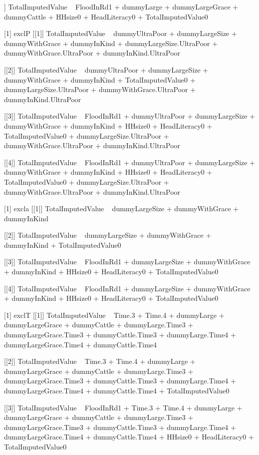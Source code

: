 \begin{Schunk}
\begin{Soutput}
[[4]]
TotalImputedValue ~ FloodInRd1 + dummyLarge + dummyLargeGrace + 
    dummyCattle + HHsize0 + HeadLiteracy0 + TotalImputedValue0

[1] exclP
[[1]]
TotalImputedValue ~ dummyUltraPoor + dummyLargeSize + dummyWithGrace + 
    dummyInKind + dummyLargeSize.UltraPoor + dummyWithGrace.UltraPoor + 
    dummyInKind.UltraPoor

[[2]]
TotalImputedValue ~ dummyUltraPoor + dummyLargeSize + dummyWithGrace + 
    dummyInKind + TotalImputedValue0 + dummyLargeSize.UltraPoor + 
    dummyWithGrace.UltraPoor + dummyInKind.UltraPoor

[[3]]
TotalImputedValue ~ FloodInRd1 + dummyUltraPoor + dummyLargeSize + 
    dummyWithGrace + dummyInKind + HHsize0 + HeadLiteracy0 + 
    TotalImputedValue0 + dummyLargeSize.UltraPoor + dummyWithGrace.UltraPoor + 
    dummyInKind.UltraPoor

[[4]]
TotalImputedValue ~ FloodInRd1 + dummyUltraPoor + dummyLargeSize + 
    dummyWithGrace + dummyInKind + HHsize0 + HeadLiteracy0 + 
    TotalImputedValue0 + dummyLargeSize.UltraPoor + dummyWithGrace.UltraPoor + 
    dummyInKind.UltraPoor

[1] excla
[[1]]
TotalImputedValue ~ dummyLargeSize + dummyWithGrace + dummyInKind

[[2]]
TotalImputedValue ~ dummyLargeSize + dummyWithGrace + dummyInKind + 
    TotalImputedValue0

[[3]]
TotalImputedValue ~ FloodInRd1 + dummyLargeSize + dummyWithGrace + 
    dummyInKind + HHsize0 + HeadLiteracy0 + TotalImputedValue0

[[4]]
TotalImputedValue ~ FloodInRd1 + dummyLargeSize + dummyWithGrace + 
    dummyInKind + HHsize0 + HeadLiteracy0 + TotalImputedValue0

[1] exclT
[[1]]
TotalImputedValue ~ Time.3 + Time.4 + dummyLarge + dummyLargeGrace + 
    dummyCattle + dummyLarge.Time3 + dummyLargeGrace.Time3 + 
    dummyCattle.Time3 + dummyLarge.Time4 + dummyLargeGrace.Time4 + 
    dummyCattle.Time4

[[2]]
TotalImputedValue ~ Time.3 + Time.4 + dummyLarge + dummyLargeGrace + 
    dummyCattle + dummyLarge.Time3 + dummyLargeGrace.Time3 + 
    dummyCattle.Time3 + dummyLarge.Time4 + dummyLargeGrace.Time4 + 
    dummyCattle.Time4 + TotalImputedValue0

[[3]]
TotalImputedValue ~ FloodInRd1 + Time.3 + Time.4 + dummyLarge + 
    dummyLargeGrace + dummyCattle + dummyLarge.Time3 + dummyLargeGrace.Time3 + 
    dummyCattle.Time3 + dummyLarge.Time4 + dummyLargeGrace.Time4 + 
    dummyCattle.Time4 + HHsize0 + HeadLiteracy0 + TotalImputedValue0


\end{Soutput}
\end{Schunk}
